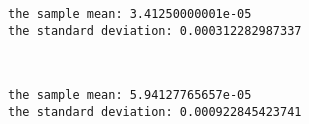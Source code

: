 \documentclass[a4paper,dvipdfmx]{jsarticle}
\newlength{\cellleftmargin}
\newlength{\smallerfontscale}
\def\smaller{\fontsize{\smallerfontscale}{\smallerfontscale}\selectfont}
\begin{document}
    \begin{addmargin}[\cellleftmargin]{0em}%
    {\smaller%
    \vspace{-1\smallerfontscale}%
    
    \begin{Verbatim}[commandchars=\\\{\}]
the sample mean: 3.41250000001e-05
the standard deviation: 0.000312282987337

    \end{Verbatim}
}%
    \end{addmargin}%
    \begin{addmargin}[\cellleftmargin]{0em}%
    {\smaller%
    \vspace{-1\smallerfontscale}%
    
    \begin{center}
    \end{center}
    { \hspace*{\fill} \\}
    }%
    \end{addmargin}%
    \begin{addmargin}[\cellleftmargin]{0em}%
    {\smaller%
    \vspace{-1\smallerfontscale}%
    
    \begin{Verbatim}[commandchars=\\\{\}]
the sample mean: 5.94127765657e-05
the standard deviation: 0.000922845423741

    \end{Verbatim}
}%
    \end{addmargin}%
\end{document}
